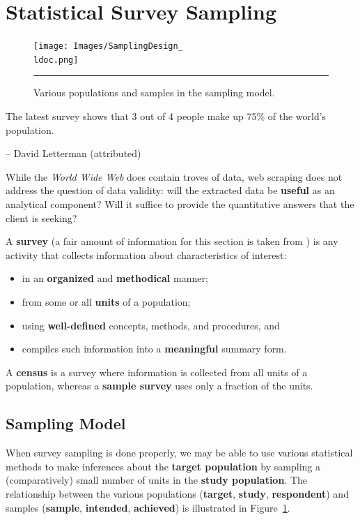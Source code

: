 \newpage
\section{Statistical Survey Sampling}
\begin{figure}[t]
\centering
\texttt{[image: Images/SamplingDesign\_\\ldoc.png]}
\caption[\small The sampling model]{\small Various populations and samples in the sampling model.} \hrule\label{fig:sammod}
\end{figure}

\begin{tcolorbox}[title=You Can't Say It's Not True]
The latest survey shows that 3 out of 4 people make up 75\% of the world's population.\\[-0.6cm]
\begin{flushright}
-- David Letterman (attributed)
\end{flushright}
\end{tcolorbox}
\noindent
While the \textit{World Wide Web} does contain troves of data, web scraping does not address the question of data validity: will the extracted data be \textbf{useful} as an analytical component? Will it  suffice to provide the quantitative answers that the client is seeking? 

A \textbf{survey} (a fair amount of information for this section is taken from \cite{DC_F,DC_SC}) is any activity that collects information about characteristics of interest:
\begin{itemize}[noitemsep] 
\item in an \textbf{organized} and \textbf{methodical} manner;
\item from some or all \textbf{units} of a population;
\item using \textbf{well-defined} concepts, methods, and procedures, and
\item compiles such information into a \textbf{meaningful} summary form. 
\end{itemize}
A \textbf{census} is a survey where information is collected from all units of a population, whereas a \textbf{sample survey} uses only a fraction of the units. 
\subsection{Sampling Model}
When survey sampling is done properly, we may be able to use various statistical methods to make inferences about the \textbf{target population} by sampling a (comparatively) small number of units in the \textbf{study population}. The relationship between the various populations (\textbf{target}, \textbf{study}, \textbf{respondent}) and samples (\textbf{sample}, \textbf{intended}, \textbf{achieved}) is illustrated in Figure~\ref{fig:sammod}. 
